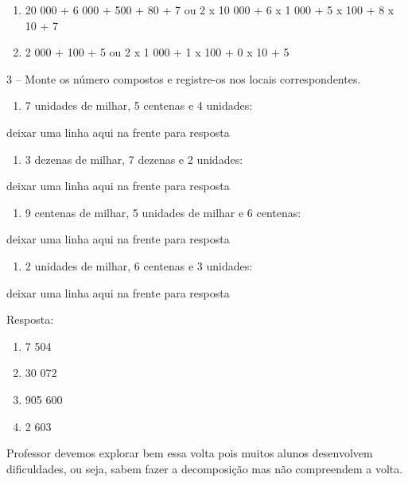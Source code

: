 \begin{enumerate}
\def\labelenumi{\alph{enumi})}
\item
  20 000 + 6 000 + 500 + 80 + 7 ou 2 x 10 000 + 6 x 1 000 + 5 x 100 + 8
  x 10 + 7
\item
  2 000 + 100 + 5 ou 2 x 1 000 + 1 x 100 + 0 x 10 + 5
\end{enumerate}

3 -- Monte os número compostos e registre-os nos locais correspondentes.

\begin{enumerate}
\def\labelenumi{\alph{enumi})}
\item
  7 unidades de milhar, 5 centenas e 4 unidades:
\end{enumerate}

deixar uma linha aqui na frente para resposta

\begin{enumerate}
\def\labelenumi{\alph{enumi})}
\item
  3 dezenas de milhar, 7 dezenas e 2 unidades:
\end{enumerate}

deixar uma linha aqui na frente para resposta

\begin{enumerate}
\def\labelenumi{\alph{enumi})}
\item
  9 centenas de milhar, 5 unidades de milhar e 6 centenas:
\end{enumerate}

deixar uma linha aqui na frente para resposta

\begin{enumerate}
\def\labelenumi{\alph{enumi})}
\item
  2 unidades de milhar, 6 centenas e 3 unidades:
\end{enumerate}

deixar uma linha aqui na frente para resposta

Resposta:

\begin{enumerate}
\def\labelenumi{\alph{enumi})}
\item
  7 504
\item
  30 072
\item
  905 600
\item
  2 603
\end{enumerate}

Professor devemos explorar bem essa volta pois muitos alunos desenvolvem
dificuldades, ou seja, sabem fazer a decomposição mas não compreendem a
volta.

